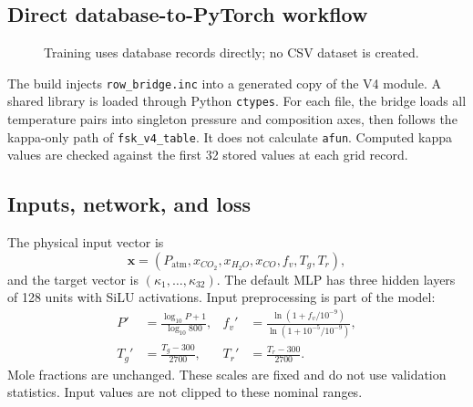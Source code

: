 \documentclass[11pt,letterpaper]{article}
\begin{document}
\subsection{Direct database-to-PyTorch workflow}
\begin{figure}[htbp]
\centering
{}
\caption{Training uses database records directly; no CSV dataset is created.}
\end{figure}
The build injects \texttt{row\_bridge.inc} into a generated copy of the V4
module. A shared library is loaded through Python \texttt{ctypes}. For each
file, the bridge loads all temperature pairs into singleton pressure and
composition axes, then follows the kappa-only path of \texttt{fsk\_v4\_table}.
It does not calculate \texttt{afun}. Computed kappa values are checked against
the first 32 stored values at each grid record.

\subsection{Inputs, network, and loss}
The physical input vector is
\[
\mathbf{x}=(P_{\mathrm{atm}},x_{CO_2},x_{H_2O},x_{CO},f_v,T_g,T_r),
\]
and the target vector is $(\kappa_1,\ldots,\kappa_{32})$.
The default MLP has three hidden layers of 128 units with SiLU activations.
Input preprocessing is part of the model:
\begin{align*}
P'&=\frac{\log_{10}P+1}{\log_{10}800}, &
f_v'&=\frac{\ln(1+f_v/10^{-9})}{\ln(1+10^{-5}/10^{-9})},\\
T_g'&=\frac{T_g-300}{2700}, & T_r'&=\frac{T_r-300}{2700}.
\end{align*}
Mole fractions are unchanged. These scales are fixed and do not use validation
statistics. Input values are not clipped to these nominal ranges.
\end{document}

